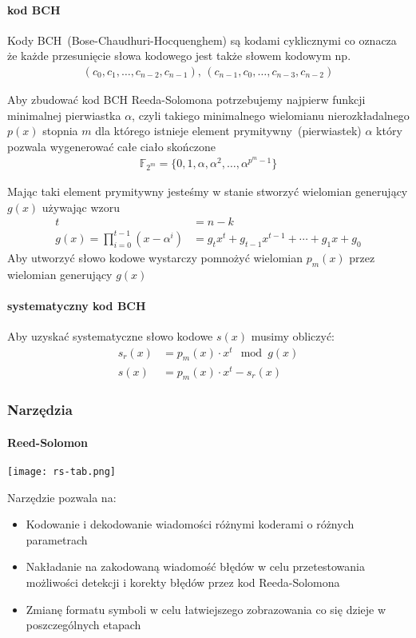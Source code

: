 \paragraph{kod BCH}

Kody BCH~(Bose-Chaudhuri-Hocquenghem) są kodami cyklicznymi co oznacza że każde przesunięcie słowa kodowego jest także słowem kodowym np.
\begin{align*}
    (c_0, c_1,\ldots, c_{n-2}, c_{n-1})\text{, }(c_{n-1}, c_0, \ldots, c_{n-3}, c_{n-2})
\end{align*}

Aby zbudować kod BCH Reeda-Solomona potrzebujemy najpierw funkcji minimalnej pierwiastka $\alpha$, czyli takiego minimalnego wielomianu nierozkładalnego $p(x)$ stopnia $m$ dla którego istnieje element prymitywny~(pierwiastek) $\alpha$ który pozwala wygenerować całe ciało skończone
\begin{align*}
    \mathbb{F}_{2^m} = \{0, 1, \alpha, \alpha^2, \ldots, \alpha^{p^{m}-1} \}
\end{align*}

Mając taki element prymitywny jesteśmy w stanie stworzyć wielomian generujący $g(x)$ używając wzoru
\begin{align*}
    t &= n - k \\
    g(x) = \prod_{i=0}^{t-1} (x - \alpha^i) &= g_{t}x^t + g_{t-1}x^{t-1} +
    \cdots + g_{1}x + g_{0}
\end{align*}
Aby utworzyć słowo kodowe wystarczy pomnożyć wielomian $p_m(x)$ przez wielomian generujący $g(x)$

\paragraph{systematyczny kod BCH}\label{systematic-bch-rs}

Aby uzyskać systematyczne słowo kodowe $s(x)$ musimy obliczyć:
\begin{align*}
    s_r(x) &= p_m(x) \cdot x^t \mod g(x) \\
    s(x) &= p_m(x) \cdot x^t - s_r(x)
\end{align*}

\subsubsection{Narzędzia}
\paragraph{Reed-Solomon}
\begin{center}
    \texttt{[image: rs-tab.png]}
\end{center}
Narzędzie pozwala na:
\begin{itemize}
    \item Kodowanie i dekodowanie wiadomości różnymi koderami o różnych
    parametrach
    \item Nakładanie na zakodowaną wiadomość błędów w celu przetestowania
    możliwości detekcji i korekty błędów przez kod Reeda-Solomona
    \item Zmianę formatu symboli w celu łatwiejszego zobrazowania co się
    dzieje w poszczególnych etapach
\end{itemize}

